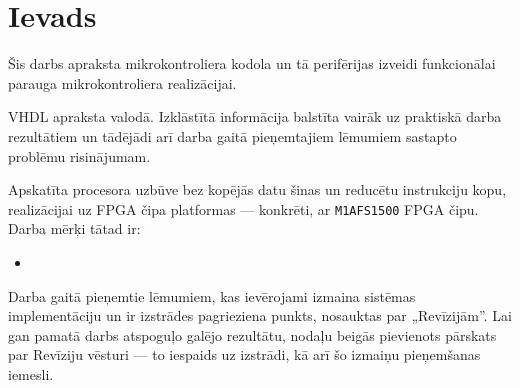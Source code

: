 \section*{Ievads} 
Šis darbs apraksta mikrokontroliera kodola un tā perifērijas izveidi
funkcionālai parauga mikrokontroliera realizācijai. \todo

	
	VHDL apraksta valodā. Izklāstītā informācija balstīta vairāk uz
	praktiskā darba rezultātiem un tādējādi arī darba gaitā pieņemtajiem
	lēmumiem sastapto problēmu risinājumam.
	
	Apskatīta procesora uzbūve bez kopējās datu šinas un reducētu instruk\-ciju
	kopu, realizācijai uz FPGA čipa platformas — konkrēti,
	 ar \texttt{M1AFS1500}
	FPGA čipu. Darba mērķi tātad ir:
	\begin{itemize}
		\item \todo
	\end{itemize}
	
	Darba gaitā pieņemtie lēmumiem, kas ievērojami izmaina sistēmas
	imple\-men\-tā\-ciju un ir izstrādes pagrieziena punkts, nosauktas par
	„Revīzijām”.
	Lai gan pamatā darbs atspoguļo galējo rezultātu, nodaļu
	beigās pievienots pārskats par Revīziju vēsturi — to iespaids uz
	izstrādi, kā arī šo izmaiņu pieņemšanas iemesli.
